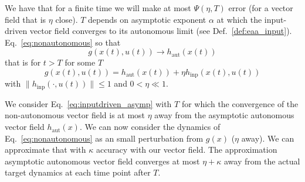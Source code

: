 \documentclass{article}
\newcounter{ct}
\begin{document}
We have that for a finite time we will make at most $\Psi(\eta,T)$ error (for a vector field that is $\eta$ close). $T$ depends on asymptotic exponent $\alpha$ at which the input-driven vector field  converges to its autonomous limit (see Def.~\ref{def:eaa_input}). %
Eq.~\ref{eq:nonautonomous} so that 
\begin{equation}\label{eq:inputdriven_asymp}
g(x(t), u(t)) \rightarrow h_{\operatorname{aut}}(x(t))
\end{equation}
that is for $t>T$ for some $T$ %
\begin{equation}\label{eq:inputdriven_asymp}
g(x(t), u(t)) =  h_{\operatorname{aut}}(x(t)) + \eta h_{\operatorname{inp}}(x(t), u(t))
\end{equation}
with $\|h_{\operatorname{inp}}(\cdot, u(t))\| \leq 1$ and $0<\eta\ll1$.

We consider Eq.~\ref{eq:inputdriven_asymp} with $T$ for which the convergence of the non-autonomous vector field is at most $\eta$ away from the asymptotic autonomous vector field $h_{\operatorname{aut}}(x)$. %
We can now consider the dynamics of Eq.~\ref{eq:nonautonomous} as an small perturbation from $g(x)$ ($\eta$ away).
We can approximate that with $\kappa$ accuracy with our vector field.
The approximation asymptotic autonomous vector field converges at most  $\eta+\kappa$ away from the actual target dynamics at each time point after $T$.
\end{document}
